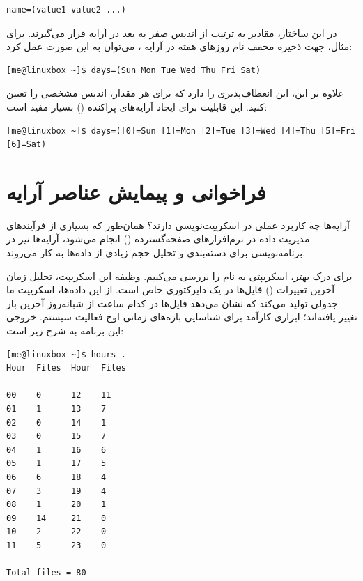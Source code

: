 \begin{latin}
\begin{lstlisting}
name=(value1 value2 ...)
\end{lstlisting}
\end{latin}

در این ساختار، مقادیر به ترتیب از اندیس صفر به بعد در آرایه قرار می‌گیرند. برای مثال، جهت ذخیره مخفف نام روزهای هفته در آرایه ، می‌توان به این صورت عمل کرد:

\begin{latin}
\begin{lstlisting}
[me@linuxbox ~]$ days=(Sun Mon Tue Wed Thu Fri Sat)
\end{lstlisting}
\end{latin}

علاوه بر این،  این انعطاف‌پذیری را دارد که برای هر مقدار، اندیس مشخصی را تعیین کنید. این قابلیت برای ایجاد آرایه‌های پراکنده () بسیار مفید است:

\begin{latin}
\begin{lstlisting}
[me@linuxbox ~]$ days=([0]=Sun [1]=Mon [2]=Tue [3]=Wed [4]=Thu [5]=Fri [6]=Sat)
\end{lstlisting}
\end{latin}

\section{فراخوانی و پیمایش عناصر آرایه}

آرایه‌ها چه کاربرد عملی در اسکریپت‌نویسی دارند؟ همان‌طور که بسیاری از فرآیندهای مدیریت داده در نرم‌افزارهای صفحه‌گسترده () انجام می‌شود، آرایه‌ها نیز در برنامه‌نویسی برای دسته‌بندی و تحلیل حجم زیادی از داده‌ها به کار می‌روند.

برای درک بهتر، اسکریپتی به نام  را بررسی می‌کنیم. وظیفه این اسکریپت، تحلیل زمان آخرین تغییرات () فایل‌ها در یک دایرکتوری خاص است. از این داده‌ها، اسکریپت ما جدولی تولید می‌کند که نشان می‌دهد فایل‌ها در کدام ساعت از شبانه‌روز آخرین بار تغییر یافته‌اند؛ ابزاری کارآمد برای شناسایی بازه‌های زمانی اوج فعالیت سیستم. خروجی این برنامه به شرح زیر است:

\begin{latin}
\begin{lstlisting}
[me@linuxbox ~]$ hours .
Hour  Files  Hour  Files
----  -----  ----  -----
00    0      12    11
01    1      13    7
02    0      14    1
03    0      15    7
04    1      16    6
05    1      17    5
06    6      18    4
07    3      19    4
08    1      20    1
09    14     21    0
10    2      22    0
11    5      23    0

Total files = 80
\end{lstlisting}
\end{latin}

